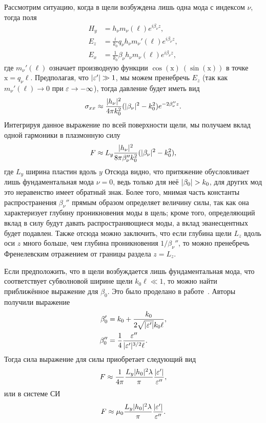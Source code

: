 Рассмотрим ситуацию, когда в щели возбуждена лишь одна мода с индексом $\nu$, тогда поля
\begin{align*}
    H_y &= h_\nu m_\nu(\ell) e^{i \beta_\nu z},  \\
    E_z &= \frac{i}{k_0} q_\nu h_\nu m_\nu'(\ell) e^{i \beta_\nu z},  \\
    E_x &= \frac{1}{k_0} \beta_\nu h_\nu m_\nu(\ell) e^{i \beta_\nu z},
\end{align*}
где $m_\nu'(\ell)$ означает производную функции $\cos(\mathrm{x}) \ (\sin(\mathrm{x}))$ в точке $\mathrm{x}= q_\nu \ell$. 
Предполагая, что $\lvert\varepsilon'\rvert \gg 1$, мы можем пренебречь $E_z$ (так как $m_\nu'(\ell) \to 0$ при $\varepsilon \to -\infty$), тогда давление будет иметь вид
\begin{equation}
   \sigma_{xx} \approx \frac{\lvert h_\nu\rvert^2}{4 \pi k_0^2}(\lvert\beta_\nu\rvert^2 - k_0^2 )e^{-2\beta_\nu'' z}.
   \label{eq:F_fund_mode_SGS}
\end{equation}
Интегрируя данное выражение по всей поверхности щели, мы получаем вклад одной гармоники в плазмонную силу
\begin{equation}
  F \approx L_y\frac{\lvert h_\nu\rvert^2}{8 \pi \beta_\nu'' k_0^2} (\lvert\beta_\nu\rvert^2 - k_0^2),
  \label{eq:F_fund_mode_SI}
\end{equation}
где $L_y$ ширина пластин вдоль $y$
Отсюда видно, что притяжение обусловливает лишь фундаментальная мода $\nu = 0$, ведь только для неё $\lvert\beta_0\rvert > k_0$, для других мод это неравенство имеет обратный знак. 
Более того, мнимая часть константы распространения $\beta_\nu''$ прямым образом определяет величину силы, так как она характеризует глубину проникновения моды в щель; кроме того, определяющий вклад в силу будут давать распространяющиеся моды, а вклад эванесцентных будет подавлен. Также отсюда можно заключить, что если глубина щели $L_z$ вдоль оси $z$ много больше, чем глубина проникновения $1/\beta_\nu''$, то можно пренебречь Френелевским отражением от границы раздела $z = L_z$.

Если предположить, что в щели возбуждается лишь фундаментальная мода, что соответствует субволновой ширине щели $k_0 \ell \ll 1$, то можно найти приближённое выражение для $\beta_0$. Это было проделано в работе~\cite{Frumin11}. Авторы получили 
выражение
\begin{align}
    \beta_0' &= k_0 + \frac{k_0}{2 \sqrt{\lvert\varepsilon'\rvert}k_0 \ell},  \\
    \beta_0'' &= \frac{1}{4}\frac{\varepsilon''}{\lvert\varepsilon'\rvert^{3/2}\ell}.
\end{align}
Тогда сила выражение для силы приобретает следующий вид
\begin{equation}
    F \approx \frac{1}{4\pi}\frac{L_y \lvert h_0\rvert^2 \lambda}{\pi}\frac{\lvert\varepsilon'\rvert}{\varepsilon''},
\end{equation}
или в системе СИ
\begin{equation}
    F \approx \mu_0\frac{L_y \lvert h_0\rvert^2 \lambda}{\pi}\frac{\lvert\varepsilon'\rvert}{\varepsilon''}.
\end{equation}

